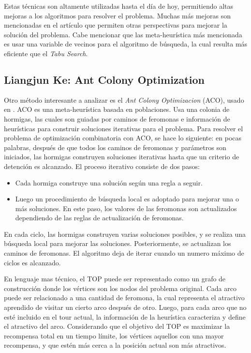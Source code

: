 \documentclass[letter, 10pt]{article}
\begin{document}
Estas técnicas son altamente utilizadas hasta el día de hoy, permitiendo altas mejoras a los algoritmos para resolver el problema. Muchas más mejoras son mencionadas en el artículo \cite{Archetti2007} que permiten otras perspectivas para mejorar la solución del problema. Cabe mencionar que las meta-heurística más mencionada es usar una variable de vecinos para el algoritmo de búsqueda, la cual resulta más eficiente que el \textit{Tabu Search}.

\subsection{Liangjun Ke: Ant Colony Optimization}

Otro método interesante a analizar es el \textit{Ant Colony Optimizacion} (ACO), usado en \cite{ProblemaHormigas}. ACO es una meta-heurística basada en poblaciones. Usa una colonia de hormigas, las cuales son guiadas por caminos de feromonas e información de heurísticas para construir soluciones iterativas para el problema. Para resolver el problema de optimización combinatoria con ACO, se hace lo siguiente: en pocas palabras, después de que todos los caminos de feromonas y parámetros son iniciados, las hormigas construyen soluciones iterativas hasta que un criterio de detención es alcanzado. El proceso iterativo consiste de dos pasos:
\begin{itemize}
    \item Cada hormiga construye una solución según una regla a seguir.
    \item Luego un procedimiento de búsqueda local es adoptado para mejorar una o más soluciones. En este paso, los valores de las feromonas son actualizados dependiendo de las reglas de actualización de feromonas. 
\end{itemize}

En cada ciclo, las hormigas construyen varias soluciones posibles, y se realiza una búsqueda local para mejorar las soluciones. Posteriormente, se actualizan los caminos de feromonas. El algoritmo deja de iterar cuando un numero máximo de ciclos es alcanzado. 

En lenguaje mas técnico, el TOP puede ser representado como un grafo de construcción donde los vértices son los nodos del problema original. Cada arco puede ser relacionado a una cantidad de feromona, la cual representa el atractivo aprendido de visitar un cierto arco después de otro. Luego, para cada arco que no esté incluido en el tour actual, la información de la heurística caracteriza y define el atractivo del arco. Considerando que el objetivo del TOP es maximizar la recompensa total en un tiempo límite, los vértices aquellos con una mayor recompensa, y que estén más cerca a la posición actual son más atractivos.
\end{document}
